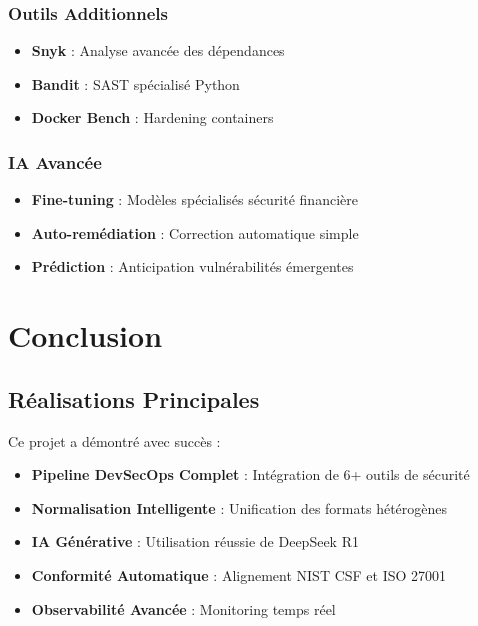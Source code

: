 \documentclass[12pt,a4paper]{report}
\begin{document}
\subsection{Outils Additionnels}
\begin{itemize}
    \item \textbf{Snyk} : Analyse avancée des dépendances
    \item \textbf{Bandit} : SAST spécialisé Python
    \item \textbf{Docker Bench} : Hardening containers
\end{itemize}

\subsection{IA Avancée}
\begin{itemize}
    \item \textbf{Fine-tuning} : Modèles spécialisés sécurité financière
    \item \textbf{Auto-remédiation} : Correction automatique simple
    \item \textbf{Prédiction} : Anticipation vulnérabilités émergentes
\end{itemize}

\newpage

\chapter{Conclusion}

\section{Réalisations Principales}

Ce projet a démontré avec succès :

\begin{itemize}
    \item \textbf{Pipeline DevSecOps Complet} : Intégration de 6+ outils de sécurité
    \item \textbf{Normalisation Intelligente} : Unification des formats hétérogènes  
    \item \textbf{IA Générative} : Utilisation réussie de DeepSeek R1
    \item \textbf{Conformité Automatique} : Alignement NIST CSF et ISO 27001
    \item \textbf{Observabilité Avancée} : Monitoring temps réel
\end{itemize}
\end{document}
